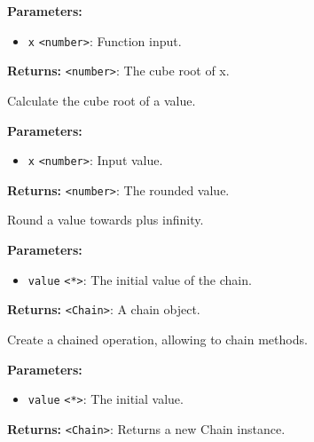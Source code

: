 \documentclass[12pt,a4paper]{article}
\begin{document}
\noindent \textbf{Parameters:}
\begin{itemize}
  \item \texttt{x} \texttt{<number>}: Function input.
\end{itemize}

\noindent \textbf{Returns:} \texttt{<number>}: The cube root of \textasciigrave{}x\textasciigrave{}.

\noindent Calculate the cube root of a value.

\vspace{5mm}
\noindent {}


\noindent \textbf{Parameters:}
\begin{itemize}
  \item \texttt{x} \texttt{<number>}: Input value.
\end{itemize}

\noindent \textbf{Returns:} \texttt{<number>}: The rounded value.

\noindent Round a value towards plus infinity.

\vspace{5mm}
\noindent {}


\noindent \textbf{Parameters:}
\begin{itemize}
  \item \texttt{value} \texttt{<*>}: The initial value of the chain.
\end{itemize}

\noindent \textbf{Returns:} \texttt{<Chain>}: A chain object.

\noindent Create a chained operation, allowing to chain methods.

\vspace{5mm}
\noindent {}


\noindent \textbf{Parameters:}
\begin{itemize}
  \item \texttt{value} \texttt{<*>}: The initial value.
\end{itemize}

\noindent \textbf{Returns:} \texttt{<Chain>}: Returns a new Chain instance.
\end{document}
